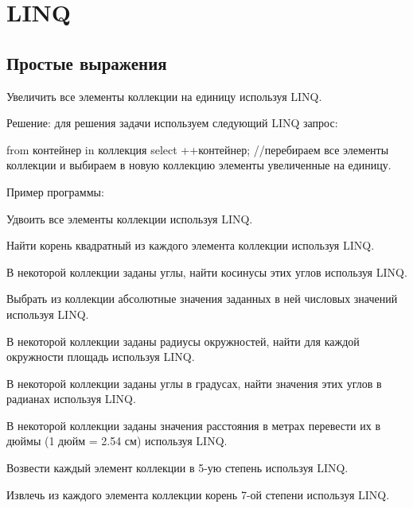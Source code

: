 \section{LINQ}

\subsection{Простые выражения}

Увеличить все элементы коллекции на единицу используя LINQ.

Решение: для решения задачи используем следующий LINQ запрос:

from контейнер in коллекция select ++контейнер; //перебираем все
элементы коллекции и выбираем в новую коллекцию элементы увеличенные
на единицу.

Пример программы:



\task Удвоить все элементы коллекции используя LINQ.

\task Найти корень квадратный из каждого элемента коллекции используя
LINQ.

\task В некоторой коллекции заданы углы, найти косинусы этих углов
используя LINQ.

\task Выбрать из коллекции абсолютные значения заданных в ней числовых
значений используя LINQ.

\task В некоторой коллекции заданы радиусы окружностей, найти для
каждой окружности площадь используя LINQ.

\task В некоторой коллекции заданы углы в градусах, найти значения
этих углов в радианах используя LINQ.

\task В некоторой коллекции заданы значения расстояния в метрах
перевести их в дюймы (1 дюйм = 2.54 см) используя LINQ.

\task Возвести каждый элемент коллекции в 5-ую степень используя LINQ.

\task Извлечь из каждого элемента коллекции корень 7-ой степени
используя LINQ.

